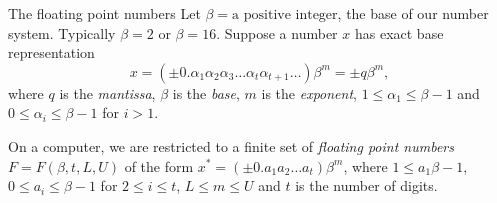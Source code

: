 \documentclass{beamer}
\begin{document}

\begin{frame}{The floating point numbers}
Let $\beta=\text{a positive integer}$, the base of our number system. Typically $\beta=2$ or $\beta=16$.
Suppose a number $x$ has exact base representation
\begin{equation*}
x = (\pm 0.\alpha_1 \alpha_2 \alpha_3 \ldots \alpha_t \alpha_{t+1} \ldots) \beta^m = \pm q \beta^m,
\end{equation*}
where $q$ is the \emph{mantissa}, $\beta$ is the \emph{base}, $m$ is the \emph{exponent}, $1 \leq \alpha_1 \leq \beta - 1$
and $0 \leq \alpha_i \leq \beta - 1$ for $i > 1$.

On a computer, we are restricted to a finite set of \emph{floating point numbers}
$F = F(\beta, t, L, U)$ of the form $x^* = (\pm0.a_1 a_2 \ldots a_t) \beta^m$, where $1 \leq a_1 \beta-1$,
$0 \leq a_i \leq \beta - 1$ for $2 \leq i \leq t$, $L \leq m \leq U$ and $t$ is the number of digits.
\end{frame}

\def\fl{\text{fl}}
\end{document}
